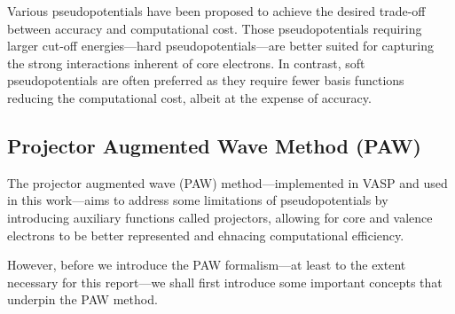 Various pseudopotentials have been proposed to achieve the desired 
trade-off between accuracy and computational cost. Those pseudopotentials requiring 
larger cut-off energies---hard pseudopotentials---are better suited for capturing 
the strong interactions inherent of core electrons. In contrast, soft pseudopotentials 
are often preferred as they require fewer basis functions reducing the 
computational cost, albeit at the expense of accuracy.

\subsection{Projector Augmented Wave Method (PAW)}
The projector augmented wave (PAW) method\supercite{Blochl1994,Kresse1999}---implemented in VASP and 
used in this work---aims to address some limitations of pseudopotentials 
by introducing auxiliary functions called projectors, allowing for core and valence electrons 
to be better represented and ehnacing computational efficiency. 

However, before we introduce the PAW formalism---at least to the extent
necessary for this report---we shall first introduce some important concepts 
that underpin the PAW method.
